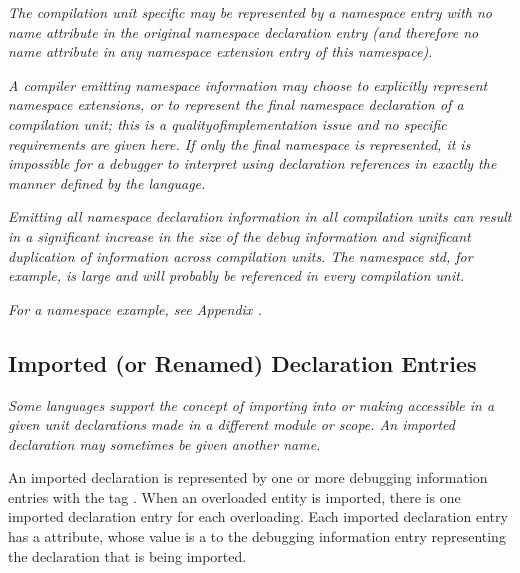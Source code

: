 \textit{The  
compilation unit specific  may
be represented by a namespace entry with no name attribute in
the original namespace declaration entry (and therefore no name
attribute in any namespace extension entry of this namespace).
}

\textit{A compiler emitting namespace information may choose to
explicitly represent namespace extensions, or to represent the
final namespace declaration of a compilation unit; this is a
quality\dash of\dash implementation issue and no specific requirements
are given here. If only the final namespace is represented,
it is impossible for a debugger to interpret using declaration
references in exactly the manner defined by the 
 language.
}

\textit{Emitting all namespace declaration information in all
compilation units can result in a significant increase in the
size of the debug information and significant duplication of
information across compilation units. 
The  namespace std,
for example, 
is large and will probably be referenced in
every  compilation unit.
}

\textit{For a  namespace example, 
see Appendix .
}



\subsection{Imported (or Renamed) Declaration Entries} 
\label{chap:importedorrenameddeclarationentries}
\textit{Some languages support the concept of importing into or making
accessible in a given unit declarations made in a different
module or scope. An imported declaration may sometimes be
given another name.
}

An 
imported declaration is represented by one or
more debugging information entries with the 
tag \DWTAGimporteddeclarationTARG. 
When 
\hypertarget{chap:DWATimportimporteddeclaration}{}
an overloaded entity
is imported, there is one imported declaration entry for
each overloading. 
Each imported declaration entry has a
\DWATimport{} attribute,
whose value is a  to the
debugging information entry representing the declaration that
is being imported.

